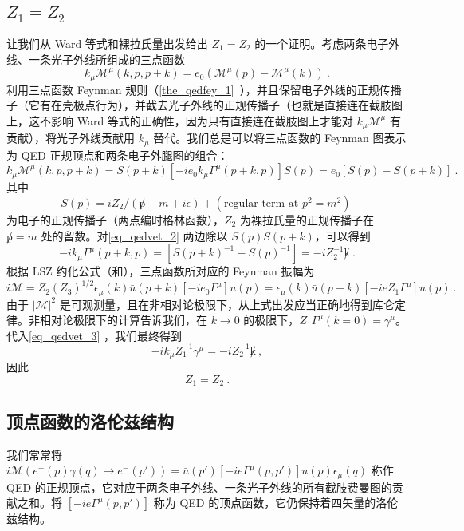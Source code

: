 \subsection{$Z_1=Z_2$}
让我们从 Ward 等式和裸拉氏量出发给出 $Z_1=Z_2$ 的一个证明。考虑两条电子外线、一条光子外线所组成的三点函数
\begin{equation}
k_\mu \mathcal{M}^\mu(k,p,p+k)=e_0(\mathcal{M}^{\mu}(p)- \mathcal{M}^{\mu}(k))~.
\end{equation}
利用三点函数 Feynman 规则（\autoref{the_qedfey_1}~），并且保留电子外线的正规传播子（它有在壳极点行为），并截去光子外线的正规传播子（也就是直接连在截肢图上，这不影响 Ward 等式的正确性，因为只有直接连在截肢图上才能对 $k_\mu \mathcal{M}^\mu$ 有贡献），将光子外线贡献用 $k_\mu$ 替代。我们总是可以将三点函数的 Feynman 图表示为 QED 正规顶点和两条电子外腿图的组合：
\begin{equation}\label{eq_qedvet_2}
k_\mu \mathcal{M}^\mu(k,p,p+k) = S(p+k) [-ie_0k_\mu \Gamma^\mu(p+k,p)] S(p) =e_0[S(p)-S(p+k)]~.
\end{equation}
其中
\begin{equation}
S(p)=iZ_2/(\not p-m+i\epsilon)+(\text{regular term at } p^2=m^2)~
\end{equation}
为电子的正规传播子（两点编时格林函数），$Z_2$ 为裸拉氏量的正规传播子在 $\not p=m$ 处的留数。对\autoref{eq_qedvet_2} 两边除以 $S(p)S(p+k)$，可以得到
\begin{equation}\label{eq_qedvet_3}
-ik_\mu \Gamma^\mu(p+k,p) = [S(p+k)^{-1}-S(p)^{-1}]= -i Z_2^{-1}\not k~.
\end{equation}
根据 LSZ 约化公式（和），三点函数所对应的 Feynman 振幅为
\begin{equation}
i\mathcal{M} = Z_2(Z_3)^{1/2}\epsilon_\mu(k)\bar u(p+k)[-ie_0\Gamma^\mu] u(p)=\epsilon_\mu(k)\bar u(p+k)[-i e Z_1\Gamma^\mu] u(p)~.
\end{equation}
由于 $|\mathcal{M}|^2$ 是可观测量，且在非相对论极限下，从上式出发应当正确地得到库仑定律。非相对论极限下的计算告诉我们，在 $k\rightarrow 0$ 的极限下，$Z_1 \Gamma^\mu(k=0) = \gamma^\mu$。代入\autoref{eq_qedvet_3} ，我们最终得到
\begin{equation}
-i k_\mu Z_1^{-1} \gamma^\mu = -i Z_2^{-1}\not k~,
\end{equation}
因此
\begin{equation}
Z_1=Z_2~.
\end{equation}



\subsection{顶点函数的洛伦兹结构}
我们常常将 $i\mathcal{M}(e^-(p)\gamma(q)\rightarrow e^-(p'))=\bar u(p') [-ie\Gamma^\mu(p,p')]u(p) \epsilon_\mu(q)$ 称作 QED 的正规顶点，它对应于两条电子外线、一条光子外线的所有截肢费曼图的贡献之和。将 $[-ie\Gamma^\mu(p,p')]$ 称为 QED 的顶点函数，它仍保持着四矢量的洛伦兹结构。

